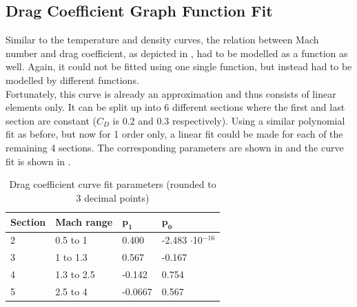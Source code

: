 
\pagebreak

\subsection{Drag Coefficient Graph Function Fit}
\label{subsec:dragCoefFuncFit}
Similar to the temperature and density curves, the relation between Mach number and drag coefficient, as depicted in , had to be modelled as a function as well. Again, it could not be fitted using one single function, but instead had to be modelled by different functions. \\

\noindent
Fortunately, this curve is already an approximation and thus consists of linear elements only. It can be split up into 6 different sections where the first and last section are constant ($C_{D}$ is 0.2 and 0.3 respectively). Using a similar polynomial fit as before, but now for 1 order only, a linear fit could be made for each of the remaining 4 sections. The corresponding parameters are shown in  and the curve fit is shown in .


\begin{table}[H]
\begin{center}
\caption{Drag coefficient curve fit parameters (rounded to 3 decimal points)}
\label{tab:dragCoeffPara}
\begin{tabular}{|l|l||l|l|}
\hline 
\textbf{Section}  & \textbf{Mach range}& $\mathbf{p_{1}}$ & $\mathbf{p_{0}}$ \\ \hline 
2  & 0.5 to 1  & 0.400 & -2.483 $\cdot$10$^{-16}$  \\ \hline
3  & 1 to 1.3  & 0.567 & -0.167  \\ \hline
4  &  1.3 to 2.5 & -0.142 & 0.754 \\ \hline
5  &  2.5 to 4 & -0.0667 & 0.567 \\ \hline
\end{tabular}
\end{center}
\end{table}




